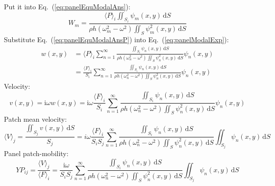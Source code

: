 \documentclass[a4paper,UTF8]{ctexart}
\begin{document}
	Put it into Eq.~(\ref{eq:panelEquModalAns}):
	\begin{equation}
	\label{eq:panelEquModalAnsP}
	W_m
	= \frac{\langle P\rangle_i\iint_{S_i}\psi_m\left(x,y\right)\,\mathrm dS}
	{\rho h\left(\omega_m^2-\omega^2\right)
		\iint_S\psi_m^2\left(x,y\right)\,\mathrm dS}
	\end{equation}
	Substitute Eq.~(\ref{eq:panelEquModalAnsP}) into Eq.~(\ref{eq:panelModalExp}):
	\begin{equation}
	\label{eq:panelEquDispAns}
	\begin{split}
	w\left(x,y\right) 
	&=\langle P\rangle_i\sum_{n=1}^{\infty}
	\frac{\iint_{S_i}\psi_n\left(x,y\right)\,\mathrm dS}
	{\rho h\left(\omega_n^2-\omega^2\right)
		\iint_S\psi_n^2\left(x,y\right)\,\mathrm dS}
	\psi_n\left(x,y\right)\\
	&=\frac{\langle F\rangle_i}{S_i} \sum_{n=1}^{\infty}
	\frac{\iint_{S_i}\psi_n\left(x,y\right)\,\mathrm dS}
	{\rho h\left(\omega_n^2-\omega^2\right)
		\iint_S\psi_n^2\left(x,y\right)\,\mathrm dS}
	\psi_n\left(x,y\right)
	\end{split}
	\end{equation}
	Velocity:
	\begin{equation}
	\label{eq:panelEquVelocityAns}
	v\left(x,y\right)
	= \mathrm i\omega w\left(x,y\right)
	= \mathrm i\omega \frac{\langle F\rangle_i}{S_i} \sum_{n=1}^{\infty}
	\frac{\iint_{S_i}\psi_n\left(x,y\right)\,\mathrm dS}
	{\rho h \left(\omega_n^2 - \omega^2\right)
		\iint_S\psi_n^2\left(x,y\right)\,\mathrm dS}
	\psi_n\left(x,y\right)
	\end{equation}
	Patch mean velocity:
	\begin{equation}
	\label{eq:panelPatchMeanVelocity}
	\langle V\rangle_j
	= \frac{\iint_{S_j}v\left(x,y\right)\,\mathrm dS} {S_j}
	= i\omega \frac{\langle F\rangle_i}{S_iS_j} \sum_{n=1}^{\infty}
	\frac{\iint_{S_i}\psi_n\left(x,y\right)\,\mathrm dS}
	{\rho h \left(\omega_n^2-\omega^2\right)
		\iint_S\psi_n^2\left(x,y\right)\,\mathrm dS}
	\iint_{S_j}\psi_n\left(x,y\right)\,\mathrm dS
	\end{equation}
	Panel patch-mobility:
	\begin{equation}
	\label{eq:panelPatchMobility}
	YP_{ij}
	= \frac{\langle V\rangle_j}{\langle F\rangle_i}
	= \frac{\mathrm i\omega}{S_iS_j} \sum_{n=1}^{\infty}
	\frac{\iint_{S_i}\psi_n\left(x,y\right) \,\mathrm dS}
	{\rho h \left(\omega_n^2-\omega^2\right)
		\iint_S\psi_n^2\left(x,y\right)\,\mathrm dS}
	\iint_{S_j}\psi_n\left(x,y\right)\,\mathrm dS
	\end{equation}
	
\end{document}

